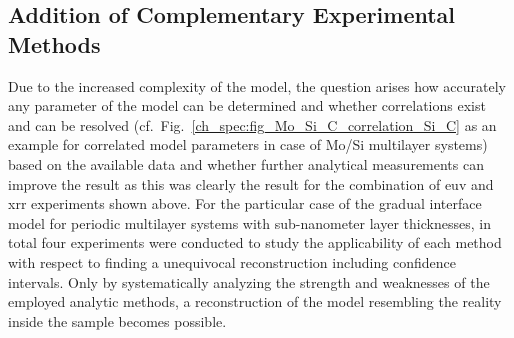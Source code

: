 \subsection{Addition of Complementary Experimental Methods}
Due to the increased complexity of the model, the question arises how accurately any parameter of the model can be determined and whether correlations exist and can be resolved (cf.~Fig.~\ref{ch_spec:fig_Mo_Si_C_correlation_Si_C} as an example for correlated model parameters in case of Mo/Si multilayer systems) based on the available data and whether further analytical measurements can improve the result as this was clearly the result for the combination of \gls{euv} and \gls{xrr} experiments shown above. For the particular case of the gradual interface model for periodic multilayer systems with sub-nanometer layer thicknesses, in total four experiments were conducted to study the applicability of each method with respect to finding a unequivocal reconstruction including confidence intervals. Only by systematically analyzing the strength and weaknesses of the employed analytic methods, a reconstruction of the model resembling the reality inside the sample becomes possible.


